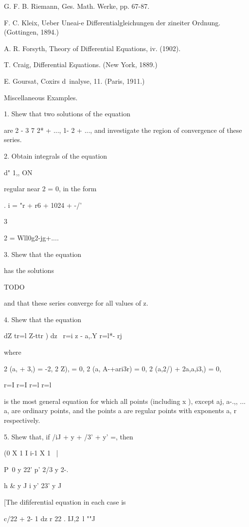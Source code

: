 G. F. B. Riemann, Ges. Math. Werke, pp. 67-87.

F. C. Kleix, Ueber Uneai-e Differentialgleichungen der zineiter
Ordnung. (Gottingen, 1894.)

A. R. Forsyth, Theory of Differential Equations, iv. (1902).

T. Craig, Differential Equations. (New York, 1889.)

E. Goursat, Coxirs d\ inalyse, 11. (Paris, 1911.)

%
%

Miscellaneous Examples.

1. Shew that two solutions of the equation

are 2 - 3 7 2* + ..., 1- 2 + ..., and investigate the region of
convergence of these series.

2. Obtain integrals of the equation

d" 1,, ON

regular near 2 = 0, in the form

. i = "r + r6 + 1024 + -/'

3

 2 = Wll0g2-jg+....

3. Shew that the equation

has the solutions

TODO

and that these series converge for all values of z.

4. Shew that the equation

dZ tr=l Z-ttr ) dz \ r=i z - a,.Y r=l*- rj

where

2 (a, + 3,) = -2, 2 Z), = 0, 2 (a, A-+ari3r) = 0, 2 (a,2/) + 2a,a,i3,)
= 0,

r=I r=I r=l r=l

is the most general equation for which all points (including x ),
except aj, a-.,, ... a, are ordinary points, and the points a are
regular points with exponents a, r respectively.


5. Shew that, if /iJ + y + /3' + y' =, then

(0 X 1 I i-1 X 1 ~|

P\ 0 y 22' p' 2/3 y 2-. 

h \& y J i y' 23' y J

[The dififerential equation in each case is

c/22 + 2- 1 dz r 22 . IJ,2\ l ""J

